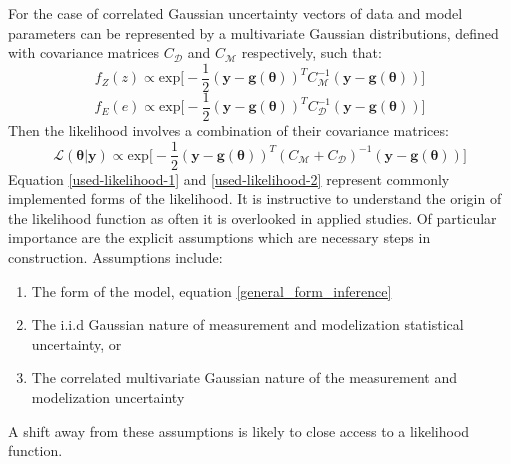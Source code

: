 \begin{tcolorbox}
\begin{multicols}{2}
For the case of correlated Gaussian uncertainty vectors of data and model parameters can be represented by a multivariate Gaussian distributions, defined with covariance matrices $C_{\mathcal{D}}$ and $C_{\mathcal{M}}$ respectively, such that:
\begin{equation}
f_Z(z) \propto \text{exp}\bigg[-\frac{1}{2}(\bm{y}-\bm{g}(\bm{\theta}))^TC_{\mathcal{M}}^{-1}(\bm{y}-\bm{g}(\bm{\theta}))\bigg]
\end{equation}
\begin{equation}
f_E(e) \propto \text{exp}\bigg[-\frac{1}{2}(\bm{y}-\bm{g}(\bm{\theta}))^TC_{\mathcal{D}}^{-1}(\bm{y}-\bm{g}(\bm{\theta}))\bigg]
\end{equation}
Then the likelihood involves a combination of their covariance matrices:
\begin{equation}
\mathcal{L}(\bm{\theta}|\bm{y}) \propto \text{exp}\bigg[-\frac{1}{2}(\bm{y}-\bm{g}(\bm{\theta}))^T(C_{\mathcal{M}}+C_{\mathcal{D}})^{-1}(\bm{y}-\bm{g}(\bm{\theta}))\bigg]
\label{used-likelihood-2}
\end{equation}
Equation \ref{used-likelihood-1} and \ref{used-likelihood-2} represent commonly implemented forms of the likelihood. It is instructive to understand the origin of the likelihood function as often it is overlooked in applied studies. Of particular importance are the explicit assumptions which are necessary steps in construction. Assumptions include:
\begin{enumerate}
\item The form of the model, equation \ref{general_form_inference}
\item The i.i.d Gaussian nature of measurement and modelization statistical uncertainty, or
\item The correlated multivariate Gaussian nature of the measurement and modelization uncertainty
\end{enumerate}
A shift away from these assumptions is likely to close access to a likelihood function.
\end{multicols}
\end{tcolorbox}